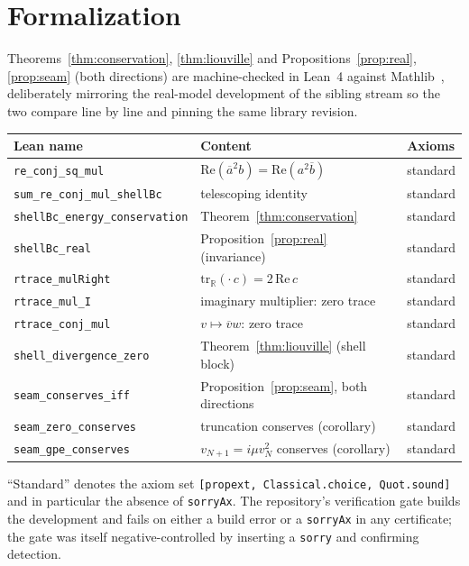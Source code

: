\documentclass[11pt,a4paper]{article}
\theoremstyle{definition}
\theoremstyle{remark}
\newcommand{\R}{\mathbb{R}}
\newcommand{\conj}[1]{\overline{#1}}
\newcommand{\lean}[1]{\texttt{\small #1}}
\begin{document}
\section{Formalization}
\label{sec:formal}

Theorems~\ref{thm:conservation}, \ref{thm:liouville} and
Propositions~\ref{prop:real}, \ref{prop:seam} (both directions) are machine-checked in
Lean~4 against Mathlib~\cite{Mathlib}, deliberately mirroring the real-model development of
the sibling stream so the two compare line by line and pinning the same library revision.

\begin{center}
\small
\begin{tabular}{@{}lll@{}}
\toprule
Lean name & Content & Axioms \\
\midrule
\lean{re\_conj\_sq\_mul} & $\mathrm{Re}(\conj{a}^2b)=\mathrm{Re}(a^2\conj{b})$ & standard \\
\lean{sum\_re\_conj\_mul\_shellBc} & telescoping identity & standard \\
\lean{shellBc\_energy\_conservation} & Theorem~\ref{thm:conservation} & standard \\
\lean{shellBc\_real} & Proposition~\ref{prop:real} (invariance) & standard \\
\lean{rtrace\_mulRight} & $\mathrm{tr}_\R(\cdot\,c) = 2\,\mathrm{Re}\,c$ & standard \\
\lean{rtrace\_mul\_I} & imaginary multiplier: zero trace & standard \\
\lean{rtrace\_conj\_mul} & $v\mapsto\conj{v}w$: zero trace & standard \\
\lean{shell\_divergence\_zero} & Theorem~\ref{thm:liouville} (shell block) & standard \\
\lean{seam\_conserves\_iff} & Proposition~\ref{prop:seam}, both directions & standard \\
\lean{seam\_zero\_conserves} & truncation conserves (corollary) & standard \\
\lean{seam\_gpe\_conserves} & $v_{N+1}=i\mu v_N^2$ conserves (corollary) & standard \\
\bottomrule
\end{tabular}
\end{center}

\noindent
``Standard'' denotes the axiom set \texttt{[propext, Classical.choice, Quot.sound]} and
in particular the absence of \texttt{sorryAx}. The repository's verification gate builds
the development and fails on either a build error or a \texttt{sorryAx} in any certificate;
the gate was itself negative-controlled by inserting a \texttt{sorry} and confirming
detection.
\end{document}
